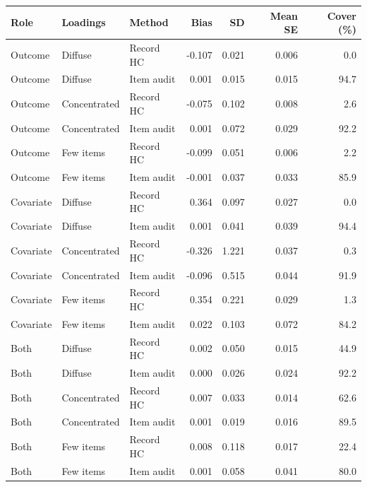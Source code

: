 \begin{tabular}{lllrrrr}
\toprule
Role & Loadings & Method & Bias & SD & Mean SE & Cover (\%) \\
\midrule
Outcome & Diffuse & Record HC & -0.107 & 0.021 & 0.006 & 0.0 \\
Outcome & Diffuse & Item audit & 0.001 & 0.015 & 0.015 & 94.7 \\
Outcome & Concentrated & Record HC & -0.075 & 0.102 & 0.008 & 2.6 \\
Outcome & Concentrated & Item audit & 0.001 & 0.072 & 0.029 & 92.2 \\
Outcome & Few items & Record HC & -0.099 & 0.051 & 0.006 & 2.2 \\
Outcome & Few items & Item audit & -0.001 & 0.037 & 0.033 & 85.9 \\
Covariate & Diffuse & Record HC & 0.364 & 0.097 & 0.027 & 0.0 \\
Covariate & Diffuse & Item audit & 0.001 & 0.041 & 0.039 & 94.4 \\
Covariate & Concentrated & Record HC & -0.326 & 1.221 & 0.037 & 0.3 \\
Covariate & Concentrated & Item audit & -0.096 & 0.515 & 0.044 & 91.9 \\
Covariate & Few items & Record HC & 0.354 & 0.221 & 0.029 & 1.3 \\
Covariate & Few items & Item audit & 0.022 & 0.103 & 0.072 & 84.2 \\
Both & Diffuse & Record HC & 0.002 & 0.050 & 0.015 & 44.9 \\
Both & Diffuse & Item audit & 0.000 & 0.026 & 0.024 & 92.2 \\
Both & Concentrated & Record HC & 0.007 & 0.033 & 0.014 & 62.6 \\
Both & Concentrated & Item audit & 0.001 & 0.019 & 0.016 & 89.5 \\
Both & Few items & Record HC & 0.008 & 0.118 & 0.017 & 22.4 \\
Both & Few items & Item audit & 0.001 & 0.058 & 0.041 & 80.0 \\
\bottomrule
\end{tabular}
